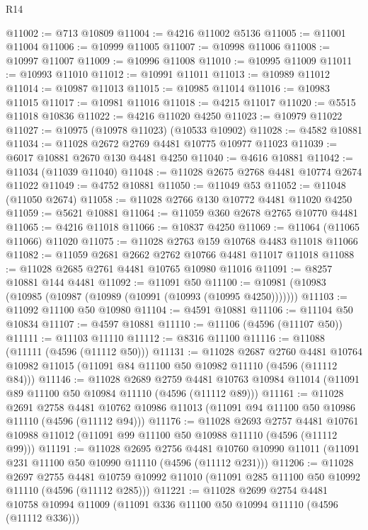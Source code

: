 \begin{lexlean}{R14}
\begin{coremodule}
@11002 := @713 @10809
@11004 := @4216 @11002 @5136
@11005 := @11001 @11004
@11006 := @10999 @11005
@11007 := @10998 @11006
@11008 := @10997 @11007
@11009 := @10996 @11008
@11010 := @10995 @11009
@11011 := @10993 @11010
@11012 := @10991 @11011
@11013 := @10989 @11012
@11014 := @10987 @11013
@11015 := @10985 @11014
@11016 := @10983 @11015
@11017 := @10981 @11016
@11018 := @4215 @11017
@11020 := @5515 @11018 @10836
@11022 := @4216 @11020 @4250
@11023 := @10979 @11022
@11027 := @10975 (@10978 @11023) (@10533 @10902)
@11028 := @4582 @10881
@11034 := @11028 @2672 @2769 @4481 @10775 @10977 @11023
@11039 := @6017 @10881 @2670 @130 @4481 @4250
@11040 := @4616 @10881
@11042 := @11034 (@11039 @11040)
@11048 := @11028 @2675 @2768 @4481 @10774 @2674 @11022
@11049 := @4752 @10881
@11050 := @11049 @53
@11052 := @11048 (@11050 @2674)
@11058 := @11028 @2766 @130 @10772 @4481 @11020 @4250
@11059 := @5621 @10881
@11064 := @11059 @360 @2678 @2765 @10770 @4481
@11065 := @4216 @11018
@11066 := @10837 @4250
@11069 := @11064 (@11065 @11066) @11020
@11075 := @11028 @2763 @159 @10768 @4483 @11018 @11066
@11082 := @11059 @2681 @2662 @2762 @10766 @4481 @11017 @11018
@11088 := @11028 @2685 @2761 @4481 @10765 @10980 @11016
@11091 := @8257 @10881 @144 @4481
@11092 := @11091 @50
@11100 := @10981 (@10983 (@10985 (@10987 (@10989 (@10991 (@10993 (@10995 @4250)))))))
@11103 := @11092 @11100 @50 @10980
@11104 := @4591 @10881
@11106 := @11104 @50 @10834
@11107 := @4597 @10881
@11110 := @11106 (@4596 (@11107 @50))
@11111 := @11103 @11110
@11112 := @8316 @11100
@11116 := @11088 (@11111 (@4596 (@11112 @50)))
@11131 := @11028
    @2687
    @2760
    @4481
    @10764
    @10982
    @11015
    (@11091 @84 @11100 @50 @10982 @11110 (@4596 (@11112 @84)))
@11146 := @11028
    @2689
    @2759
    @4481
    @10763
    @10984
    @11014
    (@11091 @89 @11100 @50 @10984 @11110 (@4596 (@11112 @89)))
@11161 := @11028
    @2691
    @2758
    @4481
    @10762
    @10986
    @11013
    (@11091 @94 @11100 @50 @10986 @11110 (@4596 (@11112 @94)))
@11176 := @11028
    @2693
    @2757
    @4481
    @10761
    @10988
    @11012
    (@11091 @99 @11100 @50 @10988 @11110 (@4596 (@11112 @99)))
@11191 := @11028
    @2695
    @2756
    @4481
    @10760
    @10990
    @11011
    (@11091 @231 @11100 @50 @10990 @11110 (@4596 (@11112 @231)))
@11206 := @11028
    @2697
    @2755
    @4481
    @10759
    @10992
    @11010
    (@11091 @285 @11100 @50 @10992 @11110 (@4596 (@11112 @285)))
@11221 := @11028
    @2699
    @2754
    @4481
    @10758
    @10994
    @11009
    (@11091 @336 @11100 @50 @10994 @11110 (@4596 (@11112 @336)))

\end{coremodule}
\end{lexlean}
